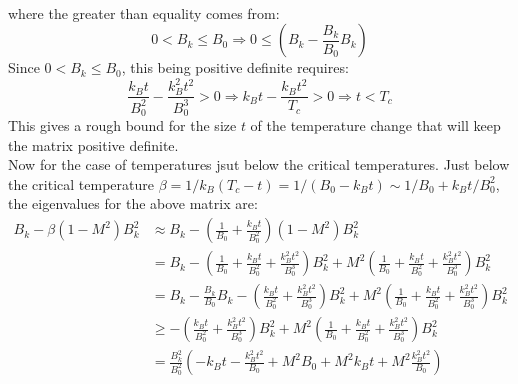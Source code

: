 \documentclass[12pt,a4]{article}
\begin{document}
\begin{enumerate}
\begin{enumerate}
\begin{align*}
        \end{align*}
        where the greater than equality comes from:
        \begin{equation*}
          0 < B_k \leq B_0 \Rightarrow 0 \leq (B_{k}  - \frac{B_k}{B_0}B_k)
        \end{equation*}
        Since $0 < B_k \leq B_0$, this being positive definite requires:
        \begin{equation*}
          \frac{k_B t}{B_0^2} - \frac{k_B^2 t^2}{B_0^3} > 0 \Rightarrow k_B t - \frac{k_B t^2}{T_c} > 0 \Rightarrow t < T_c
        \end{equation*}
        This gives a rough bound for the size $t$ of the temperature change that will keep the matrix positive definite.\\
        
        Now for the case of temperatures jsut below the critical temperatures.
        Just below the critical temperature $\beta = 1 / k_B(T_c - t) = 1 / (B_0 - k_B t) \sim 1 / B_0 + k_B t / B_0^2 $, the eigenvalues for the above matrix are:
        \begin{align}
          B_{k}  - \beta \left(1 - M^2\right) B^2_{k} 
                                                                  & \approx B_{k}  - \left(\frac{1}{B_0} +\frac{k_B t}{B_0^2}\right) \left(1 - M^2\right) B^2_{k} \nonumber\\
                                                                  & = B_{k}  - \left(\frac{1}{B_0} + \frac{k_B t}{B_0^2} + \frac{k_B^2 t^2}{B_0^3}\right) B^2_{k} + M^2 \left(\frac{1}{B_0} +\frac{k_B t}{B_0^2} + \frac{k_B^2 t^2}{B_0^3}\right) B_k^2\nonumber\\ 
                                                                  & = B_{k} - \frac{B_k}{B_0}B_k - \left(\frac{k_B t}{B_0^2} + \frac{k_B^2 t^2}{B_0^3}\right) B^2_{k} + M^2 \left(\frac{1}{B_0} +\frac{k_B t}{B_0^2} + \frac{k_B^2 t^2}{B_0^3}\right) B_k^2\nonumber\\ 
                                                                  & \geq  - \left(\frac{k_B t}{B_0^2} + \frac{k_B^2 t^2}{B_0^3}\right) B^2_{k} + M^2 \left(\frac{1}{B_0} +\frac{k_B t}{B_0^2} + \frac{k_B^2 t^2}{B_0^3}\right) B_k^2\nonumber\\ 
                                                                  & =  \frac{B_k^2}{B_0^2}\left(- k_B t - \frac{k_B^2 t^2}{B_0} + M^2 B_0 + M^2 k_B t + M^2 \frac{k_B^2 t^2}{B_0}\right) \label{eq:crazyBracketedTerm}

\end{align}
\end{enumerate}
\end{enumerate}
\end{document}
